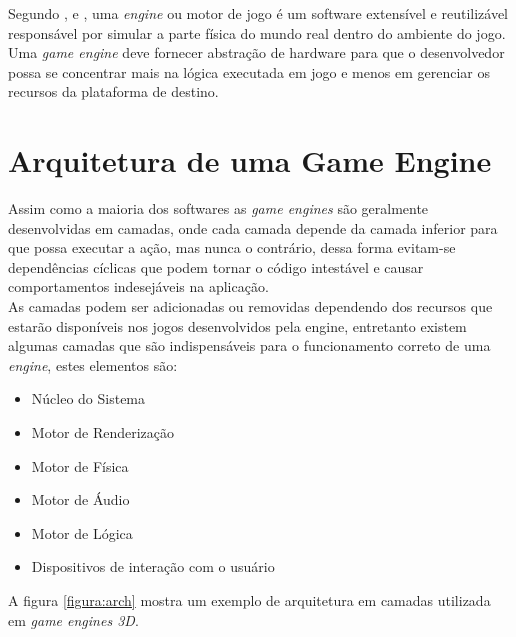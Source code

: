 \documentclass[12pt,	openright, twoside,	a4paper, english, french, spanish, brazil]{abntex2}
\begin{document}
Segundo ,  e , uma \textit{engine} ou motor de jogo é um software extensível e reutilizável responsável por simular a parte física do mundo real dentro do ambiente do jogo. Uma \textit{game engine} deve fornecer abstração de hardware para que o desenvolvedor possa se concentrar mais na lógica executada em jogo e menos em gerenciar os recursos da plataforma de destino.

%
%

\section{Arquitetura de uma Game Engine}
Assim como a maioria dos softwares as \textit{game engines} são geralmente desenvolvidas em camadas, onde cada camada depende da camada inferior para que possa executar a ação, mas nunca o contrário, dessa forma evitam-se dependências cíclicas que podem tornar o código intestável e causar comportamentos indesejáveis na aplicação. \\
As camadas podem ser adicionadas ou removidas dependendo dos recursos que estarão disponíveis nos jogos desenvolvidos pela engine, entretanto existem algumas camadas que são indispensáveis para o funcionamento correto de uma \textit{engine}, estes elementos são:

\begin{itemize}
\item Núcleo do Sistema
\item Motor de Renderização
\item Motor de Física
\item Motor de Áudio
\item Motor de Lógica
\item Dispositivos de interação com o usuário
\end{itemize}

 A  figura \ref{figura:arch} mostra um exemplo de arquitetura em camadas utilizada em \textit{game engines 3D}.
\end{document}
